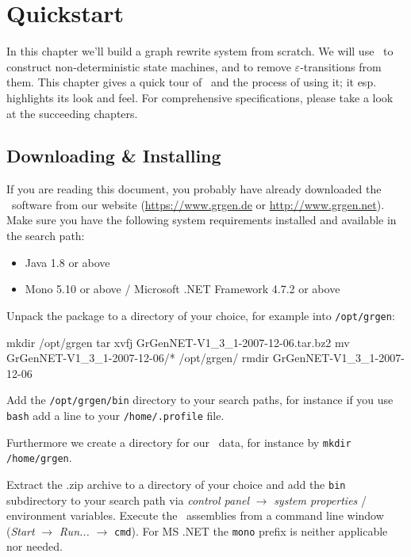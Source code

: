 \chapter{Quickstart}

In this chapter we'll build a graph rewrite system from scratch.
We will use \GrG\ to construct non-deterministic state machines, and to remove $\varepsilon$-transitions from them.
This chapter gives a quick tour of \GrG\ and the process of using it; it esp. highlights its look and feel.
For comprehensive specifications, please take a look at the succeeding chapters.


\section{Downloading \& Installing}

If you are reading this document, you probably have already downloaded the \GrG\ software from our website (\url{https://www.grgen.de} or \url{http://www.grgen.net}). Make sure you have the following system requirements installed and available in the search path:
\begin{itemize}
	\item Java 1.8 or above
	\item Mono 5.10 or above / Microsoft .NET Framework 4.7.2 or above
\end{itemize}

Unpack the package to a directory of your choice, for example into \texttt{/opt/grgen}:
\begin{bash}
mkdir /opt/grgen
tar xvfj GrGenNET-V1_3_1-2007-12-06.tar.bz2
mv GrGenNET-V1_3_1-2007-12-06/* /opt/grgen/
rmdir GrGenNET-V1_3_1-2007-12-06
\end{bash}
Add the \texttt{/opt/grgen/bin} directory to your search paths, for instance if you use \texttt{bash} add a line to your \texttt{/home/.profile} file.
Furthermore we create a directory for our \GrG\ data, for instance by \texttt{mkdir /home/grgen}.

\vspace{2mm}
Extract the .zip archive to a directory of your choice and add the \texttt{bin} subdirectory to your search path via \emph{control panel} $\rightarrow$ \emph{system properties} / environment variables.
Execute the \GrG\ assemblies from a command line window (\emph{Start} $\rightarrow$ \emph{Run...} $\rightarrow$ \texttt{cmd}).
For MS .NET the \texttt{mono} prefix is neither applicable nor needed.

